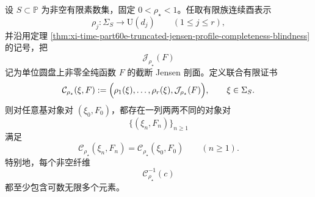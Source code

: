 \begin{theorem}\label{thm:xi-cdim-localization-solenoid-finite-visibility-jensen-certificate-incomplete}
设 \(S\subset\mathbb P\) 为非空有限素数集，固定 \(0<\rho_\star<1\)。任取有限族连续酉表示
\[
\rho_j:\Sigma_S\to \mathrm{U}(d_j)
\qquad
(1\le j\le r),
\]
并沿用定理 \ref{thm:xi-time-part60e-truncated-jensen-profile-completeness-blindness} 的记号，把
\[
\mathcal J_{\rho_\star}(F)
\]
记为单位圆盘上非零全纯函数 \(F\) 的截断 Jensen 剖面。定义联合有限证书
\[
\mathcal C_{\rho_\star}(\xi,F)
:=
\Bigl(
\rho_1(\xi),\dots,\rho_r(\xi),\mathcal J_{\rho_\star}(F)
\Bigr),
\qquad
\xi\in \Sigma_S.
\]
则对任意基对象对 \((\xi_0,F_0)\)，都存在一列两两不同的对象对
\[
\{(\xi_n,F_n)\}_{n\ge 1}
\]
满足
\[
\mathcal C_{\rho_\star}(\xi_n,F_n)
=
\mathcal C_{\rho_\star}(\xi_0,F_0)
\qquad(n\ge 1).
\]
特别地，每个非空纤维
\[
\mathcal C_{\rho_\star}^{-1}(c)
\]
都至少包含可数无限多个元素。
\end{theorem}
